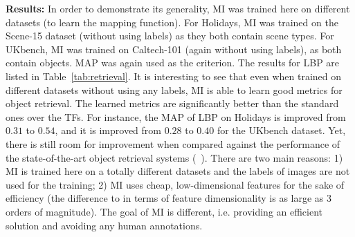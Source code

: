\documentclass[10pt,twocolumn,letterpaper]{article}
\begin{document}
\textbf{Results:} In order to demonstrate its generality, MI was
trained here on different datasets (to learn the mapping
function). For Holidays, MI was trained on the Scene-15 dataset
(without using labels) as they both contain scene types. For UKbench,
MI was trained on Caltech-101 (again without using labels), as both
contain objects. MAP was again used as the criterion.  The results for
LBP are listed in Table~\ref{tab:retrieval}.  %
It is interesting to see that even when trained on different datasets
without using any labels, MI is able to learn good metrics for object
retrieval. The learned metrics are significantly better than the
standard ones over the TFs. For instance, the MAP of LBP on Holidays
is improved from $0.31$ to $0.54$, and it is improved from $0.28$ to
$0.40$ for the UKbench dataset. Yet, there is still room for
improvement when compared against the performance of the
state-of-the-art object retrieval systems
(\eg~\cite{qin:bmvc14}). There are two main reasons: 1) MI is trained
here on a totally different datasets and the labels of images are not
used for the training; 2) MI uses cheap, low-dimensional features for
the sake of efficiency (the difference to \cite{qin:bmvc14} in terms
of feature dimensionality is as large as 3 orders of magnitude). The
goal of MI is different, i.e. providing an efficient solution and avoiding
any human annotations.
\end{document}
